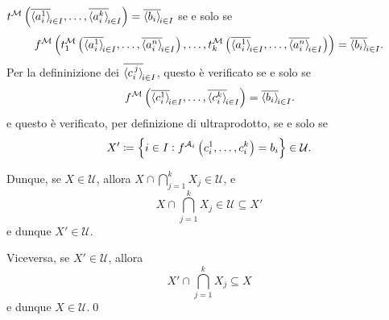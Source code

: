{\begin{itemize}
        $t^{\mathcal{M}}\left(\filtersequence[i \in I]{a_{i}^{1}},\dots,\filtersequence[i \in I]{a_{i}^{k}}\right)=\filtersequence[i \in I]{b_{i} }$ se e solo se \begin{equation*}
            f^{\mathcal{M}}\left(t_1^{\mathcal{M}}\left(\filtersequence[i \in I]{a^{1}_i},\dots,\filtersequence[i \in I]{a^{n}_i}\right),\dots,t_k^{\mathcal{M}}\left(\filtersequence[i \in I]{a^{1}_i},\dots,\filtersequence[i \in I]{a^{n}_i}\right)\right) = \filtersequence[i \in I]{b_{i} }.
        \end{equation*}Per la defininizione dei $ \filtersequence[i \in I]{c_{i}^{\, j} } $, questo è verificato se e solo se \begin{equation*}
            f^{\mathcal{M}}\left(
                \filtersequence[i \in I]{c_{i}^{1} },\dots, \filtersequence[i \in I]{c_{i}^{k} }
            \right) = \filtersequence[i \in I]{b_{i} }.
        \end{equation*}e questo è verificato, per definizione di ultraprodotto, se e solo se \begin{equation*}
            X' \coloneqq \set{i \in I : f^{\mathcal{A}_i}\left(c^{1}_i,\dots,c^{k}_i\right)=b_{i} } \in \mathcal{U}.
        \end{equation*}

        Dunque, se $ X \in \mathcal{U} $, allora $ X \cap \bigcap_{j=1}^{k} X_{j} \in \mathcal{U}   $, e \begin{equation*}
            X \cap \bigcap_{j=1}^{k} X_{j} \in \mathcal{U} \subseteq X'
        \end{equation*}e dunque $ X' \in \mathcal{U} $. 

        Viceversa, se $ X' \in \mathcal{U} $, allora \begin{equation*}
            X' \cap \bigcap_{j=1}^{k} X_{j} \subseteq X  
        \end{equation*}e dunque $ X \in \mathcal{U} $.\qed

    \end{itemize}
}
